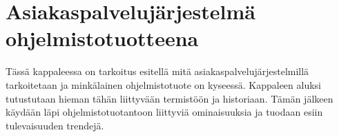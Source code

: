 \documentclass[finnish,12pt,a4paper,pdftex]{article}
\begin{document}
\clearpage

\section{Asiakaspalvelujärjestelmä ohjelmistotuotteena}
Tässä kappaleessa on tarkoitus esitellä mitä asiakaspalvelujärjestelmillä tarkoitetaan ja minkälainen ohjelmistotuote on kyseessä. Kappaleen aluksi tutustutaan hieman tähän liittyvään termistöön ja historiaan. Tämän jälkeen käydään läpi ohjelmistotuotantoon liittyviä ominaisuuksia ja tuodaan esiin tulevaisuuden trendejä.
\end{document}
